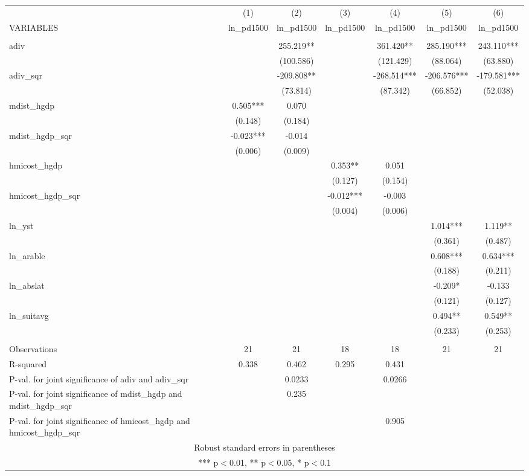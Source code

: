 \documentclass[]{article}
\begin{document}
\begin{tabular}{lcccccc} \hline
 & (1) & (2) & (3) & (4) & (5) & (6) \\
VARIABLES & ln\_pd1500 & ln\_pd1500 & ln\_pd1500 & ln\_pd1500 & ln\_pd1500 & ln\_pd1500 \\ \hline
 &  &  &  &  &  &  \\
adiv &  & 255.219** &  & 361.420** & 285.190*** & 243.110*** \\
 &  & (100.586) &  & (121.429) & (88.064) & (63.880) \\
adiv\_sqr &  & -209.808** &  & -268.514*** & -206.576*** & -179.581*** \\
 &  & (73.814) &  & (87.342) & (66.852) & (52.038) \\
mdist\_hgdp & 0.505*** & 0.070 &  &  &  &  \\
 & (0.148) & (0.184) &  &  &  &  \\
mdist\_hgdp\_sqr & -0.023*** & -0.014 &  &  &  &  \\
 & (0.006) & (0.009) &  &  &  &  \\
hmicost\_hgdp &  &  & 0.353** & 0.051 &  &  \\
 &  &  & (0.127) & (0.154) &  &  \\
hmicost\_hgdp\_sqr &  &  & -0.012*** & -0.003 &  &  \\
 &  &  & (0.004) & (0.006) &  &  \\
ln\_yst &  &  &  &  & 1.014*** & 1.119** \\
 &  &  &  &  & (0.361) & (0.487) \\
ln\_arable &  &  &  &  & 0.608*** & 0.634*** \\
 &  &  &  &  & (0.188) & (0.211) \\
ln\_abslat &  &  &  &  & -0.209* & -0.133 \\
 &  &  &  &  & (0.121) & (0.127) \\
ln\_suitavg &  &  &  &  & 0.494** & 0.549** \\
 &  &  &  &  & (0.233) & (0.253) \\
 &  &  &  &  &  &  \\
Observations & 21 & 21 & 18 & 18 & 21 & 21 \\
R-squared & 0.338 & 0.462 & 0.295 & 0.431 &  &  \\
P-val. for joint significance of adiv and adiv\_sqr &  & 0.0233 &  & 0.0266 &  &  \\
P-val. for joint significance of mdist\_hgdp and mdist\_hgdp\_sqr &  & 0.235 &  &  &  &  \\
 P-val. for joint significance of hmicost\_hgdp and hmicost\_hgdp\_sqr &  &  &  & 0.905 &  &  \\ \hline
\multicolumn{7}{c}{ Robust standard errors in parentheses} \\
\multicolumn{7}{c}{ *** p$<$0.01, ** p$<$0.05, * p$<$0.1} \\
\end{tabular}
\end{document}
